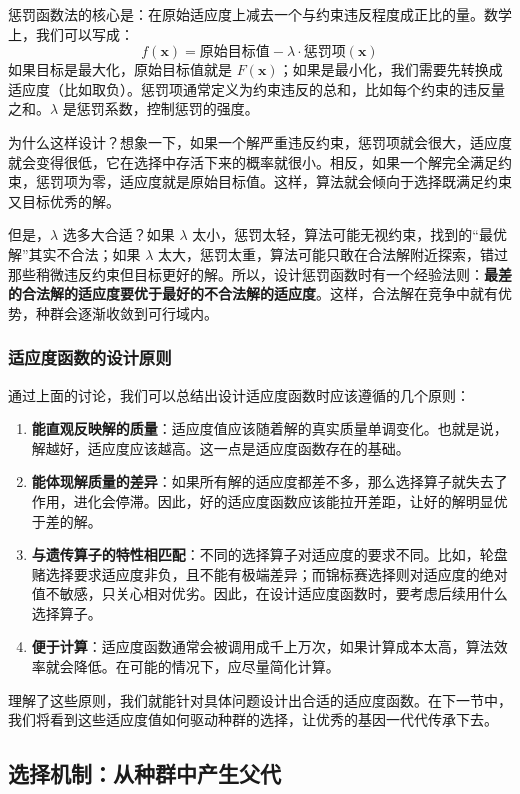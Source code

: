 \documentclass[lang=cn,zihao=-4,a4paper,fontset=windows]{beautybook}
\begin{document}
惩罚函数法的核心是：在原始适应度上减去一个与约束违反程度成正比的量。数学上，我们可以写成：
\[
f(\mathbf{x}) = \text{原始目标值} - \lambda \cdot \text{惩罚项}(\mathbf{x})
\]
如果目标是最大化，原始目标值就是 $F(\mathbf{x})$；如果是最小化，我们需要先转换成适应度（比如取负）。惩罚项通常定义为约束违反的总和，比如每个约束的违反量之和。$\lambda$ 是惩罚系数，控制惩罚的强度。

为什么这样设计？想象一下，如果一个解严重违反约束，惩罚项就会很大，适应度就会变得很低，它在选择中存活下来的概率就很小。相反，如果一个解完全满足约束，惩罚项为零，适应度就是原始目标值。这样，算法就会倾向于选择既满足约束又目标优秀的解。

但是，$\lambda$ 选多大合适？如果 $\lambda$ 太小，惩罚太轻，算法可能无视约束，找到的“最优解”其实不合法；如果 $\lambda$ 太大，惩罚太重，算法可能只敢在合法解附近探索，错过那些稍微违反约束但目标更好的解。所以，设计惩罚函数时有一个经验法则：\textbf{最差的合法解的适应度要优于最好的不合法解的适应度}。这样，合法解在竞争中就有优势，种群会逐渐收敛到可行域内。

\subsubsection{适应度函数的设计原则}

通过上面的讨论，我们可以总结出设计适应度函数时应该遵循的几个原则：

\begin{enumerate}
    \item \textbf{能直观反映解的质量}：适应度值应该随着解的真实质量单调变化。也就是说，解越好，适应度应该越高。这一点是适应度函数存在的基础。
    \item \textbf{能体现解质量的差异}：如果所有解的适应度都差不多，那么选择算子就失去了作用，进化会停滞。因此，好的适应度函数应该能拉开差距，让好的解明显优于差的解。
    \item \textbf{与遗传算子的特性相匹配}：不同的选择算子对适应度的要求不同。比如，轮盘赌选择要求适应度非负，且不能有极端差异；而锦标赛选择则对适应度的绝对值不敏感，只关心相对优劣。因此，在设计适应度函数时，要考虑后续用什么选择算子。
    \item \textbf{便于计算}：适应度函数通常会被调用成千上万次，如果计算成本太高，算法效率就会降低。在可能的情况下，应尽量简化计算。
\end{enumerate}

理解了这些原则，我们就能针对具体问题设计出合适的适应度函数。在下一节中，我们将看到这些适应度值如何驱动种群的选择，让优秀的基因一代代传承下去。


\subsection{选择机制：从种群中产生父代}
\end{document}
